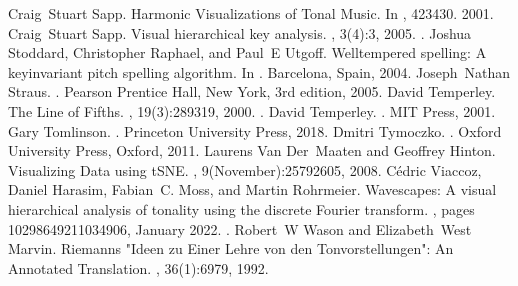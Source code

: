 \documentclass[letterpaper,10pt,english]{sphinxmanual}
\begin{document}
\begin{sphinxthebibliography}{10}
\sphinxAtStartPar
Craig Stuart Sapp. Harmonic Visualizations of Tonal Music. In , 423\textendash{}430. 2001.
\sphinxAtStartPar
Craig Stuart Sapp. Visual hierarchical key analysis. , 3(4):3, 2005. .
\sphinxAtStartPar
Joshua Stoddard, Christopher Raphael, and Paul E Utgoff. Well\sphinxhyphen{}tempered spelling: A key\sphinxhyphen{}invariant pitch spelling algorithm. In . Barcelona, Spain, 2004.
\sphinxAtStartPar
Joseph Nathan Straus. . Pearson Prentice Hall, New York, 3rd edition, 2005.
\sphinxAtStartPar
David Temperley. The Line of Fifths. , 19(3):289\textendash{}319, 2000. .
\sphinxAtStartPar
David Temperley. . MIT Press, 2001.
\sphinxAtStartPar
Gary Tomlinson. . Princeton University Press, 2018.
\sphinxAtStartPar
Dmitri Tymoczko. . Oxford University Press, Oxford, 2011.
\sphinxAtStartPar
Laurens Van Der Maaten and Geoffrey Hinton. Visualizing Data using t\sphinxhyphen{}SNE. , 9(November):2579\textendash{}2605, 2008.
\sphinxAtStartPar
Cédric Viaccoz, Daniel Harasim, Fabian C. Moss, and Martin Rohrmeier. Wavescapes: A visual hierarchical analysis of tonality using the discrete Fourier transform. , pages 10298649211034906, January 2022. .
\sphinxAtStartPar
Robert W Wason and Elizabeth West Marvin. Riemann\textquotesingle{}s "Ideen zu Einer \textquotesingle{}Lehre von den Tonvorstellungen\textquotesingle{}": An Annotated Translation. , 36(1):69\textendash{}79, 1992.

\end{sphinxthebibliography}
\end{document}
